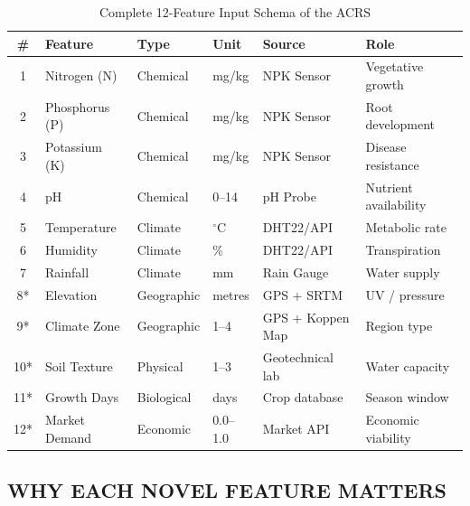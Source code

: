 \documentclass[12pt,a4paper,oneside]{report}
\begin{document}
\begin{table}[H]
\centering
\caption{Complete 12-Feature Input Schema of the ACRS}
\label{tab:features}
\renewcommand{\arraystretch}{1.35}
\begin{tabular}{c p{2.8cm} p{1.8cm} p{2.0cm} p{2.5cm} p{2.2cm}}
\toprule
\textbf{\#} & \textbf{Feature} & \textbf{Type} & \textbf{Unit} & \textbf{Source} & \textbf{Role} \\
\midrule
1 & Nitrogen (N) & Chemical & mg/kg & NPK Sensor & Vegetative growth \\
2 & Phosphorus (P) & Chemical & mg/kg & NPK Sensor & Root development \\
3 & Potassium (K) & Chemical & mg/kg & NPK Sensor & Disease resistance \\
4 & pH & Chemical & 0--14 & pH Probe & Nutrient availability \\
5 & Temperature & Climate & $^{\circ}$C & DHT22/API & Metabolic rate \\
6 & Humidity & Climate & \% & DHT22/API & Transpiration \\
7 & Rainfall & Climate & mm & Rain Gauge & Water supply \\
8* & Elevation & Geographic & metres & GPS + SRTM & UV / pressure \\
9* & Climate Zone & Geographic & 1--4 & GPS + Koppen Map & Region type \\
10* & Soil Texture & Physical & 1--3 & Geotechnical lab & Water capacity \\
11* & Growth Days & Biological & days & Crop database & Season window \\
12* & Market Demand & Economic & 0.0--1.0 & Market API & Economic viability \\
\bottomrule
\end{tabular}
\end{table}

\subsection{WHY EACH NOVEL FEATURE MATTERS}
\end{document}
